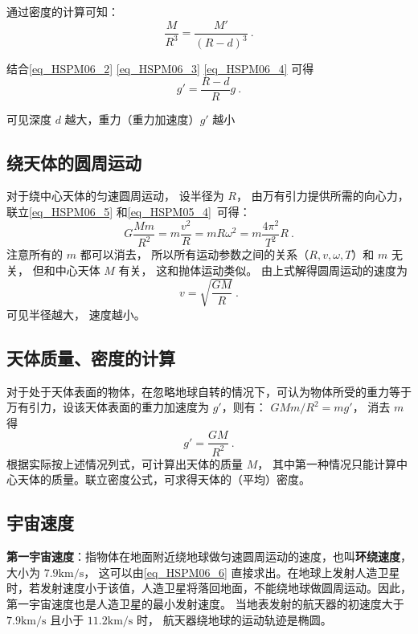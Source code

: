 通过密度的计算可知：
\begin{equation}\label{eq_HSPM06_4}
\frac{M}{R^3}=\frac{M'}{(R-d)^3}~.
\end{equation}

结合\autoref{eq_HSPM06_2} \autoref{eq_HSPM06_3} \autoref{eq_HSPM06_4} 可得
\begin{equation}
g'=\frac{R-d}{R}g~.
\end{equation}

可见深度 $d$ 越大，重力（重力加速度）$g'$ 越小

\subsection{绕天体的圆周运动}

对于绕中心天体的匀速圆周运动， 设半径为 $R$， 由万有引力提供所需的向心力， 联立\autoref{eq_HSPM06_5} 和\autoref{eq_HSPM05_4}~可得：
\begin{equation}\label{eq_HSPM06_8}
G\frac{Mm}{R^2}=m\frac{v^2}{R}=mR\omega^2=m\frac{4\pi^2}{T^2}R~.
\end{equation}
注意所有的 $m$ 都可以消去， 所以所有运动参数之间的关系（$R,v,\omega,T$）和 $m$ 无关， 但和中心天体 $M$ 有关， 这和抛体运动类似。 由上式解得圆周运动的速度为
\begin{equation}\label{eq_HSPM06_6}
v = \sqrt{\frac{GM}{R}}~.
\end{equation}
可见半径越大， 速度越小。

\subsection{天体质量、密度的计算}

对于处于天体表面的物体，在忽略地球自转的情况下，可认为物体所受的重力等于万有引力，设该天体表面的重力加速度为 $g'$，则有： $GMm/R^2=mg'$， 消去 $m$ 得
\begin{equation}
g' = \frac{GM}{R^2}~.
\end{equation}
根据实际按上述情况列式，可计算出天体的质量 $M$， 其中第一种情况只能计算中心天体的质量。联立密度公式，可求得天体的（平均）密度。

\subsection{宇宙速度}

\textbf{第一宇宙速度}：指物体在地面附近绕地球做匀速圆周运动的速度，也叫\textbf{环绕速度}，大小为 $7.9\mathrm{km/s}$， 这可以由\autoref{eq_HSPM06_6} 直接求出。在地球上发射人造卫星时，若发射速度小于该值，人造卫星将落回地面，不能绕地球做圆周运动。因此，第一宇宙速度也是人造卫星的最小发射速度。 当地表发射的航天器的初速度大于 $7.9\mathrm{km/s}$ 且小于 $11.2\mathrm{km/s}$ 时， 航天器绕地球的运动轨迹是椭圆。

